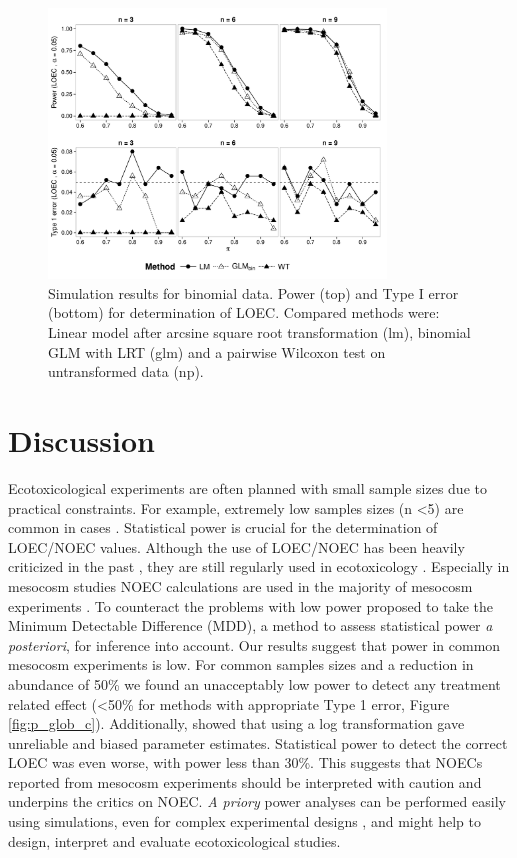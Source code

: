 \documentclass{scrartcl}
\begin{document}
\begin{figure}
  \centering
  \includegraphics[width = 0.8\textwidth]{p_loec_p.pdf}
  \caption{Simulation results for binomial data. Power (top) and Type I error (bottom) for determination of LOEC. Compared methods were: Linear model after arcsine square root transformation (lm), binomial GLM with LRT (glm) and a pairwise Wilcoxon test on untransformed data (np).}
  \label{fig:p_loec_p}
\end{figure}



\section{Discussion}
\label{sec:disc}
Ecotoxicological experiments are often planned with small sample sizes due to practical constraints. 
For example, extremely low samples sizes (n \textless 5) are common in cases \citep{sanderson_pesticide_2002,szocs_analysing_2015}.
Statistical power is crucial for the determination of LOEC/NOEC values.
Although the use of LOEC/NOEC has been heavily criticized in the past \citep{landis_well_2011},  they are still regularly used in ecotoxicology \citep{jager_bad_2012}.
Especially in mesocosm studies NOEC calculations are used in the majority of mesocosm experiments \citep{brock_minimum_2015,efsa_ppr_guidance_2013}.
To counteract the problems with low power \citet{brock_minimum_2015} proposed to take the Minimum Detectable Difference (MDD), a method to assess statistical power \emph{a posteriori}, for inference into account.
Our results suggest that power in common mesocosm experiments is low.
For common samples sizes and a reduction in abundance of 50\% we found an unacceptably low power to detect any treatment related effect (\textless 50\% for methods with appropriate Type 1 error, Figure \ref{fig:p_glob_c}).
Additionally, \citet{ohara_not_2010} showed that using a log transformation gave unreliable and biased parameter estimates.
Statistical power to detect the correct LOEC was even worse, with power less than 30\%.
This suggests that NOECs reported from mesocosm experiments should be interpreted with caution and underpins the critics on NOEC.
\emph{A priory} power analyses can be performed easily using simulations, even for complex experimental designs \citep{johnson_power_2014}, and might help to design, interpret and evaluate ecotoxicological studies.
\end{document}
